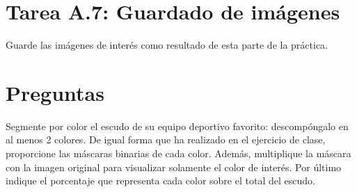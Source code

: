 \section*{Tarea A.7: Guardado de imágenes}

Guarde las imágenes de interés como resultado de esta parte de la práctica.

\section*{Preguntas}

\vspace{5mm}
\begin{tcolorbox}[colback=gray!10, colframe=gray!30, coltitle=black, title=Pregunta A.1, halign=left]
Segmente por color el escudo de su equipo deportivo favorito: descompóngalo en al menos 2 colores. De igual forma que ha realizado en el ejercicio de clase, proporcione las máscaras binarias de cada color. Además, multiplique la máscara con la imagen original para visualizar solamente el color de interés. Por último indique el porcentaje que representa cada color sobre el total del escudo.
\end{tcolorbox}